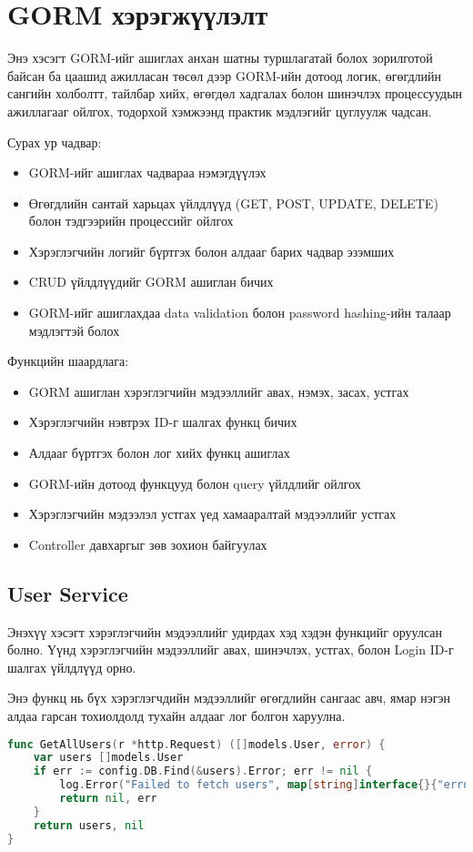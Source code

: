 \section{GORM хэрэгжүүлэлт}

Энэ хэсэгт GORM-ийг ашиглах анхан шатны туршлагатай болох зорилготой байсан ба цаашид ажилласан төсөл дээр GORM-ийн дотоод логик, өгөгдлийн сангийн холболтт, тайлбар хийх, өгөгдөл хадгалах болон шинэчлэх процессуудын ажиллагааг ойлгох, тодорхой хэмжээнд практик мэдлэгийг цуглуулж чадсан.

Сурах ур чадвар: 
\begin{itemize} 
	\item GORM-ийг ашиглах чадвараа нэмэгдүүлэх 
	\item Өгөгдлийн сантай харьцах үйлдлүүд (GET, POST, UPDATE, DELETE) болон тэдгээрийн процессийг ойлгох 
	\item Хэрэглэгчийн логийг бүртгэх болон алдааг барих чадвар эзэмших 
	\item CRUD үйлдлүүдийг GORM ашиглан бичих 
	\item GORM-ийг ашиглахдаа data validation болон password hashing-ийн талаар мэдлэгтэй болох \end{itemize}

Функцийн шаардлага: 
\begin{itemize} 
	\item GORM ашиглан хэрэглэгчийн мэдээллийг авах, нэмэх, засах, устгах 
	\item Хэрэглэгчийн нэвтрэх ID-г шалгах функц бичих 
	\item Алдааг бүртгэх болон лог хийх функц ашиглах 
	\item GORM-ийн дотоод функцууд болон query үйлдлийг ойлгох 
	\item Хэрэглэгчийн мэдээлэл устгах үед хамааралтай мэдээллийг устгах
	\item Controller  давхаргыг зөв зохион байгуулах
\end{itemize}
	
\subsection{User Service}

Энэхүү хэсэгт хэрэглэгчийн мэдээллийг удирдах хэд хэдэн функцийг оруулсан болно. Үүнд хэрэглэгчийн мэдээллийг авах, шинэчлэх, устгах, болон Login ID-г шалгах үйлдлүүд орно.

Энэ функц нь бүх хэрэглэгчдийн мэдээллийг өгөгдлийн сангаас авч, ямар нэгэн алдаа гарсан тохиолдолд тухайн алдааг лог болгон харуулна.
\begin{lstlisting}[language=Go, caption=Get All Users Service, frame=single]
func GetAllUsers(r *http.Request) ([]models.User, error) {
	var users []models.User
	if err := config.DB.Find(&users).Error; err != nil {
		log.Error("Failed to fetch users", map[string]interface{}{"error": err.Error()}, r)
		return nil, err
	}
	return users, nil
}
\end{lstlisting}

